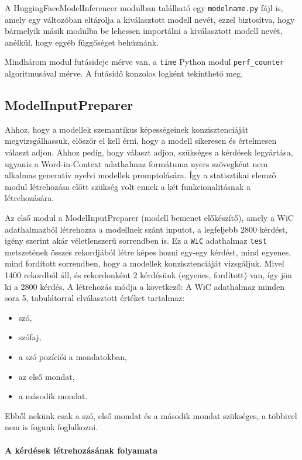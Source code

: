 \documentclass[12pt]{report}
\begin{document}
    A HuggingFaceModelInferencer modulban található egy \verb|modelname.py| fájl is, amely egy változóban eltárolja a kiválasztott modell nevét, ezzel biztosítva, hogy bármelyik másik modulba be lehessen importálni a kiválasztott modell nevét, anélkül, hogy egyéb függőséget behúznánk.

    Mindhárom modul futásideje mérve van, a \texttt{\allowbreak time} Python modul \texttt{\allowbreak perf\_counter} algoritmusával mérve. A futásidő konzolos logként tekinthető meg.

    \subsection{ModelInputPreparer}

    Ahhoz, hogy a modellek szemantikus képességeinek konzisztenciáját megvizsgálhassuk, először el kell érni, hogy a modell sikeresen és értelmesen választ adjon.
    Ahhoz pedig, hogy választ adjon, szükséges a kérdések legyártása, ugyanis a Word-in-Context adathalmaz formátuma nyers szövegként nem alkalmas generatív nyelvi modellek promptolására.
    Így a statisztikai elemző modul létrehozása előtt szükség volt ennek a két funkcionalitásnak a létrehozására.

    Az első modul a ModelInputPreparer (modell bemenet előkészítő), amely a WiC adathalmazból létrehozza a modellnek szánt inputot, a legfeljebb 2800 kérdést, igény szerint akár véletlenszerű sorrendben is.
    Ez a \texttt{\allowbreak WiC} adathalmaz \texttt{\allowbreak test} metszetének összes rekordjából létre képes hozni egy-egy kérdést, mind egyenes, mind fordított sorrendben, hogy a modellek konzisztenciáját vizsgáljuk. Mivel 1400 rekordból áll, és rekordonként 2 kérdésünk (egyenes, fordított) van, így jön ki a 2800 kérdés. A létrehozás módja a következő:
    A WiC adathalmaz minden sora 5, tabulátorral elválasztott értéket tartalmaz:
    \begin{itemize}
        \item szó,\item  szófaj, \item a szó pozíciói a mondatokban, \item az első mondat, \item a második mondat.
    \end{itemize}
    
    Ebből nekünk csak a szó, első mondat és a második mondat szükséges, a többivel nem is fogunk foglalkozni.
    
    \paragraph{A kérdések létrehozásának folyamata}
    \subparagraph{}
\end{document}
